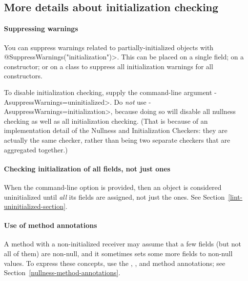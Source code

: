 \subsection{More details about initialization checking\label{initialization-checking}}


\paragraph{Suppressing warnings\label{initialization-checking-suppressing-warnings}}

\begin{sloppypar}
You can suppress warnings related to partially-initialized objects with
\<@SuppressWarnings("initialization")>.
This can be placed on a single field; on a constructor; or on a class to
suppress all initialization warnings for all constructors.
\end{sloppypar}

To disable initialization checking, supply the command-line argument
\<-AsuppressWarnings=uninitialized>.  Do \emph{not} use
\<-AsuppressWarnings=initialization>, because doing so will disable all
nullness checking as well as all initialization checking.  (That is because
of an implementation detail of the Nullness and Initialization Checkers:
they are actually the same checker, rather than being two separate checkers
that are aggregated together.)


\paragraph{Checking initialization of all fields, not just  ones\label{initialization-checking-all-fields}}

When the  command-line option is provided, then
an object is considered uninitialized until \emph{all} its fields are assigned, not
just the  ones.  See Section~\ref{lint-uninitialized-section}.


\paragraph{Use of method annotations\label{initialization-checking-method-annotations}}

A method with a non-initialized receiver may assume that a few fields (but not all
of them) are non-null, and it sometimes sets some more fields to non-null
values.  To express these concepts, use the
,
, and
 method annotations;
see Section~\ref{nullness-method-annotations}.


